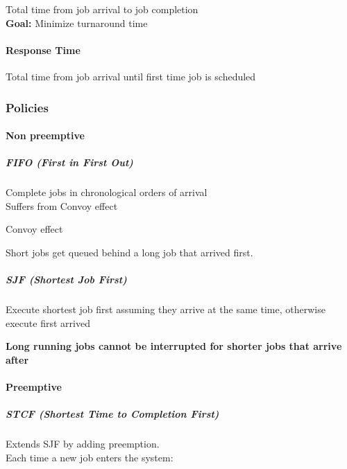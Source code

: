 \documentclass[
]{article}
\begin{document}
Total time from job arrival to job completion\\
\textbf{Goal:} Minimize turnaround time

\hypertarget{response-time}{%
\paragraph{Response Time}\label{response-time}}

Total time from job arrival until first time job is scheduled

\hypertarget{policies}{%
\subsubsection{Policies}\label{policies}}

\hypertarget{non-preemptive}{%
\paragraph{Non preemptive}\label{non-preemptive}}

\hypertarget{fifo-first-in-first-out}{%
\subparagraph{FIFO (First in First Out)}\label{fifo-first-in-first-out}}

Complete jobs in chronological orders of arrival\\
Suffers from Convoy effect

Convoy effect

Short jobs get queued behind a long job that arrived first.

\hypertarget{sjf-shortest-job-first}{%
\subparagraph{SJF (Shortest Job First)}\label{sjf-shortest-job-first}}

Execute shortest job first assuming they arrive at the same time,
otherwise execute first arrived

\textbf{Long running jobs cannot be interrupted for shorter jobs that
arrive after}

\hypertarget{preemptive}{%
\paragraph{Preemptive}\label{preemptive}}

\hypertarget{stcf-shortest-time-to-completion-first}{%
\subparagraph{STCF (Shortest Time to Completion
First)}\label{stcf-shortest-time-to-completion-first}}

Extends SJF by adding preemption.\\
Each time a new job enters the system:
\end{document}
